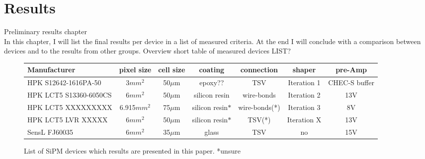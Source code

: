 \documentclass[article,type=msc,colorback,accentcolor=tud9c]{tudthesis}
\begin{document}
\newpage
\section{Results}
\label{sec:results_ch}
Preliminary results chapter\\
In this chapter, I will list the final results per device in a list of measured criteria. At the end I will conclude with a comparison between devices and to the results from other groups.
Overview short table of measured devices LIST?
\begin{figure}[h]
\begin{tabular}{ l | c | c | c | c | c | c }
    \hline
    Manufacturer                    & pixel size  & cell size & coating          & connection & shaper      & pre-Amp \\ \hline
    HPK S12642-1616PA-50   & 3$mm^2$     & 50$\mu$m  & epoxy??          & TSV        & Iteration 1 & CHEC-S buffer \\ \hline
    HPK LCT5 S13360-6050CS & 6$mm^2$     & 50$\mu$m  & silicon resin    & wire-bonds & Iteration 2 & 13V \\ \hline
    HPK LCT5 XXXXXXXXX & 6.915$mm^2$ & 75$\mu$m  & silicon resin$*$ & wire-bonds(*) & Iteration 3 & 8V \\ \hline
    HPK LCT5 LVR XXXXX & 6$mm^2$     & 50$\mu$m  & silicon resin$*$ & TSV(*) & Iteration X & 13V \\ \hline
    SensL FJ60035            & 6$mm^2$     & 35$\mu$m  & glass            & TSV        & no          & 15V \\
    \hline
\end{tabular}
\caption{List of SiPM devices which results are presented in this paper.    *unsure}
\end{figure}
\end{document}
